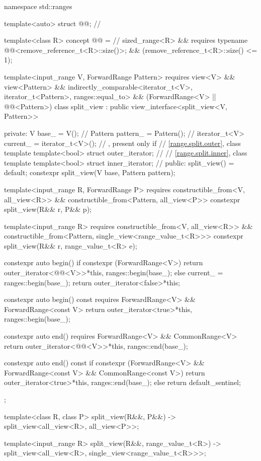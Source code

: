 \begin{codeblock}
namespace std::ranges {
  template<auto> struct @@;       // \expos

  template<class R>
  concept @@ =                          // \expos
    sized_range<R> &&
    requires { typename @@<remove_reference_t<R>::size()>; } &&
    (remove_reference_t<R>::size() <= 1);

  template<input_range V, ForwardRange Pattern>
    requires view<V> && view<Pattern> &&
             indirectly_comparable<iterator_t<V>, iterator_t<Pattern>, ranges::equal_to> &&
             (ForwardRange<V> || @@<Pattern>)
  class split_view : public view_interface<split_view<V, Pattern>> {
  private:
    V base_ = V();                              // \expos
    Pattern pattern_ = Pattern();               // \expos
    iterator_t<V> current_ = iterator_t<V>();   // \expos, present only if 
    // \ref{range.split.outer}, class template 
    template<bool> struct outer_iterator;       // \expos
    // \ref{range.split.inner}, class template 
    template<bool> struct inner_iterator;       // \expos
  public:
    split_view() = default;
    constexpr split_view(V base, Pattern pattern);

    template<input_range R, ForwardRange P>
      requires constructible_from<V, all_view<R>> &&
               constructible_from<Pattern, all_view<P>>
    constexpr split_view(R&& r, P&& p);

    template<input_range R>
      requires constructible_from<V, all_view<R>> &&
               constructible_from<Pattern, single_view<range_value_t<R>>>
    constexpr split_view(R&& r, range_value_t<R> e);

    constexpr auto begin() {
      if constexpr (ForwardRange<V>)
        return outer_iterator<@@<V>>{*this, ranges::begin(base_)};
      else {
        current_ = ranges::begin(base_);
        return outer_iterator<false>{*this};
      }
    }

    constexpr auto begin() const requires ForwardRange<V> && ForwardRange<const V> {
      return outer_iterator<true>{*this, ranges::begin(base_)};
    }

    constexpr auto end() requires ForwardRange<V> && CommonRange<V> {
      return outer_iterator<@@<V>>{*this, ranges::end(base_)};
    }

    constexpr auto end() const {
      if constexpr (ForwardRange<V> && ForwardRange<const V> && CommonRange<const V>)
        return outer_iterator<true>{*this, ranges::end(base_)};
      else
        return default_sentinel;
    }
  };

  template<class R, class P>
    split_view(R&&, P&&) -> split_view<all_view<R>, all_view<P>>;

  template<input_range R>
    split_view(R&&, range_value_t<R>)
      -> split_view<all_view<R>, single_view<range_value_t<R>>>;
}
\end{codeblock}

